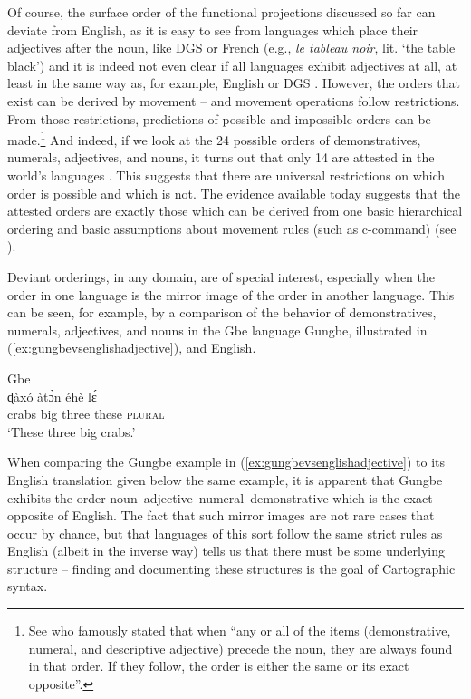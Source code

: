 Of course, the surface order of the  functional projections discussed so far can deviate from English, as it is easy to see from languages which place their adjectives after the noun, like DGS or French (e.g., \textit{le tableau noir}, lit. `the table black') and it is indeed not even clear if all languages exhibit adjectives at all, at least in the same way as, for example, English or DGS \citep{croft1991syntactic,dixon2004adjective}. However, the orders that exist can be derived by movement -- and movement operations follow restrictions. From those restrictions, predictions of possible and impossible orders can be made.\footnote{ See \citet[87]{greenberg1963some} who famously stated that when ``any or all of the items (demonstrative, numeral, and descriptive adjective) precede the noun, they are always found in that order. If they follow, the order is either the same or its exact opposite''. } 
And indeed, if we look at the 24 possible orders of demonstratives, numerals, adjectives, and nouns, it turns out that only 14 are attested in the world's languages \citep{cinque2006restructuring,abels2009universal}. This suggests that there are universal restrictions on which order is possible and which is not. The evidence available today suggests that the attested orders are exactly those which can be derived from one basic hierarchical ordering and basic assumptions about movement rules (such as c-command) (see \citealt{medeiros2012movement}). 

Deviant orderings, in any domain, are of special interest, especially when the order in one language is the mirror image of the order in another language. This can be seen, for example, by a comparison of the behavior of demonstratives, numerals, adjectives, and nouns in the Gbe language Gungbe, illustrated in (\ref{ex:gungbevsenglishadjective}), and English.

\begin{exe}
\ex Gbe \citep[92]{aboh2004morphosyntax} \\
 {ɖàxó} {àtɔ̀n} {éhè} {lɛ́} \\
{crabs} {big} {three} {these} {\textsc{plural}} \\
\trans `These three big crabs.' \label{ex:gungbevsenglishadjective}
\end{exe} 


\noindent When comparing the Gungbe example in (\ref{ex:gungbevsenglishadjective}) to its English translation given below the same example, it is apparent that Gungbe exhibits the order noun--adjective--numeral--demonstrative which is the exact opposite of English. The fact that such mirror images are not rare cases that occur by chance, but that languages of this sort follow the same strict rules as English (albeit in the inverse way) tells us that there must be some underlying structure -- finding and documenting these structures is the goal of Cartographic syntax.

